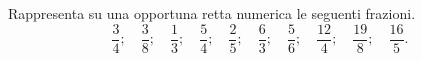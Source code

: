 % 
% 
% 
% 
% 

\begin{esercizio}
\label{ese:3.142}
Rappresenta su una opportuna retta numerica le seguenti frazioni.
\[\frac{3}{4};\quad\frac{3}{8};\quad\frac{1}{3};\quad\frac{5}{4};\quad
\frac{2}{5};\quad\frac{6}{3};\quad\frac{5}{6};\quad%
\frac{12}{4};\quad\frac{19}{8};\quad\frac{16}{5}.\]
\end{esercizio}

